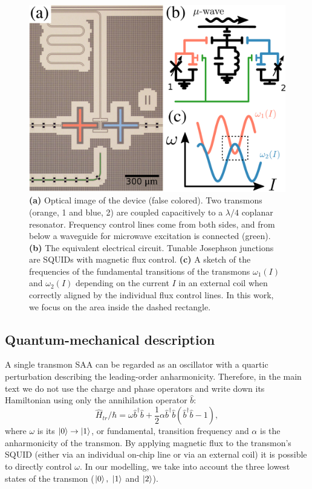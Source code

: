 \documentclass[%
 aps, prx,
 amsmath,amssymb,
 reprint,%
superscriptaddress
]{revtex4-2}
\begin{document}
\begin{figure}
	 	\includegraphics[width=\linewidth]{experiment_2}
	\caption{\textbf{(a)} Optical image of 
	the device (false colored). Two transmons 
	(orange, 1 and blue, 2) are coupled 
	capacitively to a $\lambda/4$ coplanar 
	resonator. Frequency control lines come from 
	both sides, and from below a waveguide for 
	microwave excitation  is connected (green). 
	\textbf{(b)} The equivalent electrical 
	circuit. Tunable Josephson junctions are 
	SQUIDs with magnetic flux control. 
	\textbf{(c)} A sketch of the frequencies of the fundamental 
	transitions of the transmons $\omega_1(I)$ 
	and $\omega_2(I)$ depending on the current 
	$I$ in an external coil when correctly 
	aligned by the individual flux control lines. 
	In this work, we focus on the area inside the 
	dashed rectangle.}
	\label{fig:experiment}
\end{figure}


\vspace{-.5cm}
\subsection{Quantum-mechanical description}

A single transmon SAA can be regarded as an 
oscillator with a quartic perturbation describing 
the leading-order anharmonicity. Therefore, in 
the main text we do not use the charge and phase 
operators and write down its Hamiltonian using 
only the annihilation operator $\hat b$:
\begin{equation}
\hat{{H}}_{tr}/\hbar = \omega \hat 
b^{\dagger}\hat b +\frac{1}{2}\alpha \hat 
b^{\dagger}\hat b(\hat b^{\dagger}\hat b-1),
\label{eq:h1tr}
\end{equation}
where $\omega$ is its 
$\ket{0}\rightarrow\ket{1}$, or fundamental, 
transition frequency and $\alpha$ is the 
anharmonicity of the transmon. By applying 
magnetic flux to the transmon's SQUID (either via 
an individual on-chip line or via an external 
coil) it is possible \cite{koch2007charge} to 
directly  control $\omega$. In our modelling, we 
take into account the three lowest states of the 
transmon ($\ket{0},\ \ket{1}$ and $\ket{2}$).
\end{document}
